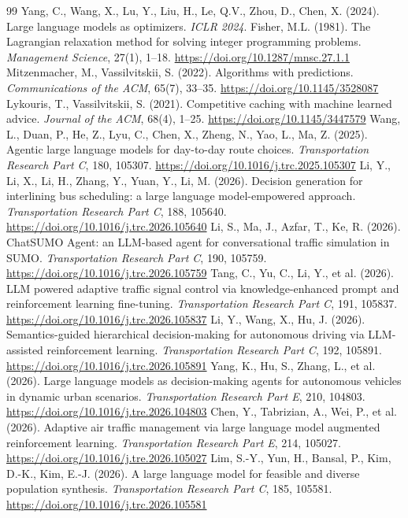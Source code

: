 \documentclass[preprint,12pt,letterpaper]{elsarticle}
\theoremstyle{definition}
\theoremstyle{plain}
\begin{document}
\begin{thebibliography}{99}
 Yang, C., Wang, X., Lu, Y., Liu, H., Le, Q.V., Zhou, D., Chen, X. (2024). Large language models as optimizers. \textit{ICLR 2024}.
 Fisher, M.L. (1981). The Lagrangian relaxation method for solving integer programming problems. \textit{Management Science}, 27(1), 1--18. \url{https://doi.org/10.1287/mnsc.27.1.1}
 Mitzenmacher, M., Vassilvitskii, S. (2022). Algorithms with predictions. \textit{Communications of the ACM}, 65(7), 33--35. \url{https://doi.org/10.1145/3528087}
 Lykouris, T., Vassilvitskii, S. (2021). Competitive caching with machine learned advice. \textit{Journal of the ACM}, 68(4), 1--25. \url{https://doi.org/10.1145/3447579}
 Wang, L., Duan, P., He, Z., Lyu, C., Chen, X., Zheng, N., Yao, L., Ma, Z. (2025). Agentic large language models for day-to-day route choices. \textit{Transportation Research Part C}, 180, 105307. \url{https://doi.org/10.1016/j.trc.2025.105307}
 Li, Y., Li, X., Li, H., Zhang, Y., Yuan, Y., Li, M. (2026). Decision generation for interlining bus scheduling: a large language model-empowered approach. \textit{Transportation Research Part C}, 188, 105640. \url{https://doi.org/10.1016/j.trc.2026.105640}
 Li, S., Ma, J., Azfar, T., Ke, R. (2026). ChatSUMO Agent: an LLM-based agent for conversational traffic simulation in SUMO. \textit{Transportation Research Part C}, 190, 105759. \url{https://doi.org/10.1016/j.trc.2026.105759}
 Tang, C., Yu, C., Li, Y., et al. (2026). LLM powered adaptive traffic signal control via knowledge-enhanced prompt and reinforcement learning fine-tuning. \textit{Transportation Research Part C}, 191, 105837. \url{https://doi.org/10.1016/j.trc.2026.105837}
 Li, Y., Wang, X., Hu, J. (2026). Semantics-guided hierarchical decision-making for autonomous driving via LLM-assisted reinforcement learning. \textit{Transportation Research Part C}, 192, 105891. \url{https://doi.org/10.1016/j.trc.2026.105891}
 Yang, K., Hu, S., Zhang, L., et al. (2026). Large language models as decision-making agents for autonomous vehicles in dynamic urban scenarios. \textit{Transportation Research Part E}, 210, 104803. \url{https://doi.org/10.1016/j.tre.2026.104803}
 Chen, Y., Tabrizian, A., Wei, P., et al. (2026). Adaptive air traffic management via large language model augmented reinforcement learning. \textit{Transportation Research Part E}, 214, 105027. \url{https://doi.org/10.1016/j.tre.2026.105027}
 Lim, S.-Y., Yun, H., Bansal, P., Kim, D.-K., Kim, E.-J. (2026). A large language model for feasible and diverse population synthesis. \textit{Transportation Research Part C}, 185, 105581. \url{https://doi.org/10.1016/j.trc.2026.105581}

\end{thebibliography}
\end{document}
